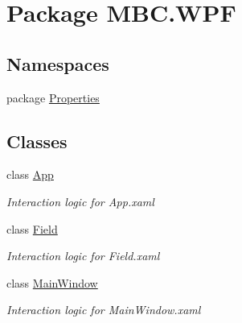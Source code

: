 \hypertarget{namespace_m_b_c_1_1_w_p_f}{\section{Package M\-B\-C.\-W\-P\-F}
\label{namespace_m_b_c_1_1_w_p_f}
}
\subsection*{Namespaces}
\begin{DoxyCompactItemize}
\item 
package \hyperlink{namespace_m_b_c_1_1_w_p_f_1_1_properties}{Properties}
\end{DoxyCompactItemize}
\subsection*{Classes}
\begin{DoxyCompactItemize}
\item 
class \hyperlink{class_m_b_c_1_1_w_p_f_1_1_app}{App}
\begin{DoxyCompactList}\small\item\em Interaction logic for App.\-xaml \end{DoxyCompactList}\item 
class \hyperlink{class_m_b_c_1_1_w_p_f_1_1_field}{Field}
\begin{DoxyCompactList}\small\item\em Interaction logic for Field.\-xaml \end{DoxyCompactList}\item 
class \hyperlink{class_m_b_c_1_1_w_p_f_1_1_main_window}{Main\-Window}
\begin{DoxyCompactList}\small\item\em Interaction logic for Main\-Window.\-xaml \end{DoxyCompactList}\end{DoxyCompactItemize}
